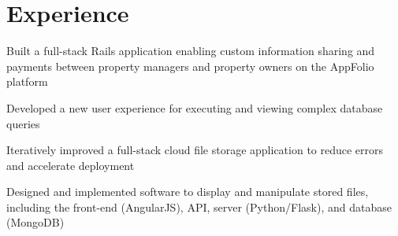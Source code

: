 \section{Experience}

\begin{tightemize}
\item Built a full-stack Rails application enabling custom information sharing and payments between property managers and property owners on the AppFolio platform
\item Developed a new user experience for executing and viewing complex database queries
\end{tightemize}
\sectionsep

\begin{tightemize}
\item Iteratively improved a full-stack cloud file storage application to reduce errors and accelerate deployment
\item Designed and implemented software to display and manipulate stored files, including the front-end (AngularJS), API, server (Python/Flask), and database (MongoDB)
\end{tightemize}
\sectionsep
